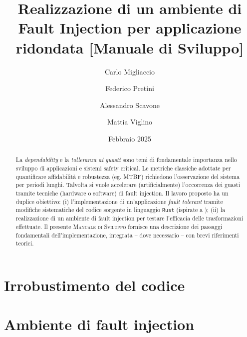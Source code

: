 \documentclass{article}
\title{\textbf{ Realizzazione di un ambiente di Fault Injection
per applicazione ridondata
[Manuale di Sviluppo]}}
\author{Carlo Migliaccio}
\author{Federico Pretini}
\author{Alessandro Scavone}
\author{Mattia Viglino}
\affil[1]{\small{Laurea Magistrale in Ingegneria Informatica, Politecnico di Torino}}
\date{Febbraio 2025}
\begin{document}
\renewcommand{\labelenumii}{\arabic{enumi}.\arabic{enumii}}

\maketitle
\thispagestyle{empty}
\vspace{-0.8cm}
\begin{abstract}
    \noindent
    La \textit{dependability} e la \textit{tolleranza ai guasti} sono temi di fondamentale importanza nello sviluppo di applicazioni e sistemi safety critical. Le metriche classiche adottate per quantificare affidabilità e robustezza (eg. MTBF) richiedono l'osservazione del sistema per periodi lunghi. Talvolta si vuole accelerare (artificialmente)  l'occorrenza dei guasti tramite tecniche (hardware o software) di fault injection. Il lavoro proposto ha un duplice obiettivo: (i) l'implementazione di un'applicazione \textit{fault tolerant} tramite modifiche sistematiche del codice sorgente in linguaggio \texttt{Rust} (ispirate a \cite{rebaudengo1999soft}); (ii) la realizzazione di un ambiente di fault injection per testare l'efficacia delle trasformazioni effettuate. Il presente \textsc{Manuale di Sviluppo} fornisce una descrizione dei passaggi fondamentali dell'implementazione, integrata -- dove necessario -- con brevi riferimenti teorici.
\end{abstract}
\tableofcontents

\newpage

        
\part{Irrobustimento del codice}
     
    
\part{Ambiente di fault injection}
     
 
        
    
     


\newpage
\printbibliography[title=Riferimenti bibliografifi]
\end{document}
